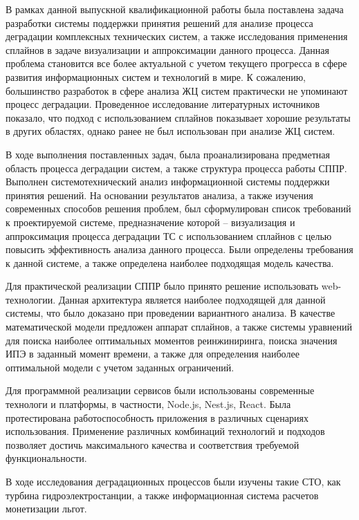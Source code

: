 
В рамках данной выпускной квалификационной работы была поставлена задача разработки системы поддержки принятия решений для анализе процесса деградации комплексных технических систем, а также исследования применения сплайнов в задаче визуализации и аппроксимации данного процесса. 
Данная проблема становится все более актуальной с учетом текущего прогресса в сфере развития информационных систем и технологий в мире. 
К сожалению, большинство разработок в сфере анализа ЖЦ систем практически не упоминают процесс деградации. 
Проведенное исследование литературных источников показало, что подход с использованием сплайнов показывает хорошие результаты в других областях, однако ранее не был использован при анализе ЖЦ систем. 

В ходе выполнения поставленных задач, была проанализирована предметная область процесса деградации систем, а также структура процесса работы СППР. 
Выполнен системотехнический анализ информационной системы поддержки принятия решений.
На основании результатов анализа, а также изучения современных способов решения проблем, был сформулирован список требований к проектируемой системе, предназначение которой – визуализация и аппроксимация процесса деградации ТС с использованием сплайнов с целью повысить эффективность анализа данного процесса. 
Были определены требования к данной системе, а также определена наиболее подходящая модель качества.

Для практической реализации СППР было принято решение использовать web-технологии. 
Данная архитектура является наиболее подходящей для данной системы, что было доказано при проведении вариантного анализа. 
В качестве математической модели предложен аппарат сплайнов, а также системы уравнений для поиска наиболее оптимальных моментов реинжиниринга, поиска значения ИПЭ в заданный момент времени, а также для определения наиболее оптимальной модели с учетом заданных ограничений.

Для программной реализации сервисов были использованы современные технологи и платформы, в частности, Node.js, Nest.js, React. 
Была протестирована работоспособность приложения в различных сценариях использования.
Применение различных комбинаций технологий и подходов позволяет достичь максимального качества и соответствия требуемой функциональности.

В ходе исследования деградационных процессов были изучены такие СТО, как турбина гидроэлектростанции,
а также информационная система расчетов монетизации льгот.

